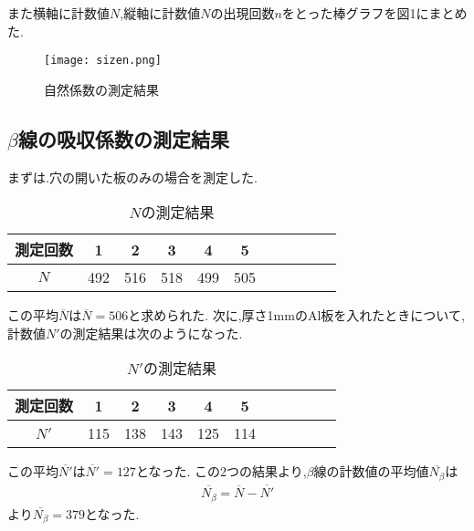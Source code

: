 \documentclass[a4j,10pt]{jarticle}
\begin{document}
  また横軸に計数値$N$,縦軸に計数値$N$の出現回数$n$をとった棒グラフを図1にまとめた.
  \begin{figure}[htbp]
    \begin{center}
    \texttt{[image: sizen.png]}
    \caption{自然係数の測定結果}
    \end{center}
  \end{figure}
  \subsection{$\beta$線の吸収係数の測定結果}
  まずは.穴の開いた板のみの場合を測定した.
  \begin{table}[h]
    \begin{center}
      \caption{$N$の測定結果}
        \begin{tabular}{c|cccccccccc}
          \hline
          測定回数 & 1 & 2 & 3 & 4 & 5  \\ \hline
          $N$ & 492 & 516 & 518 & 499 & 505 \\
          \hline
        \end{tabular}
    \end{center}
  \end{table}
    この平均$\overline{N}$は$\overline{N}=506$と求められた.
  次に,厚さ1mmのAl板を入れたときについて,計数値$N'$の測定結果は次のようになった.

  \begin{table}[h]
    \begin{center}
      \caption{$N'$の測定結果}
        \begin{tabular}{c|cccccccccc}
        \hline
        測定回数 & 1 & 2 & 3 & 4 & 5  \\ \hline
        $N'$ & 115 & 138 & 143 & 125 & 114 \\
        \hline
        \end{tabular}
      \end{center}
    \end{table}
    
  この平均$\overline{N'}$は$\overline{N'}=127$となった.
  この2つの結果より,$\beta$線の計数値の平均値$\overline{N_\beta}$は
  \begin{eqnarray}
    \overline{N_\beta}　= \overline{N} - \overline{N'}
  \end{eqnarray}
  より$\overline{N_\beta}=379$となった.
\end{document}
